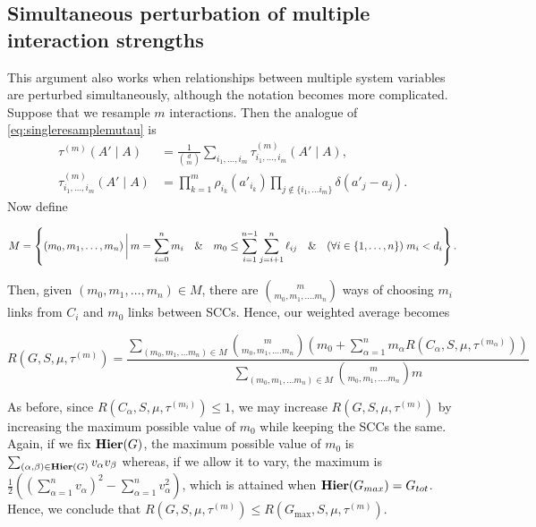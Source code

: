 \subsection{Simultaneous perturbation of multiple interaction strengths}
This argument also works when relationships between multiple system variables are perturbed simultaneously,
although the notation becomes more complicated.  Suppose that we
resample $m$ interactions.  Then the analogue of \ref{eq:singleresamplemutau} is
\begin{equation}\label{eq:multipleresamplemutau}
\begin{aligned}
\tau^{(m)}(A' \mid A) &= \frac{1}{\binom{d}{m}} \sum_{i_1, \ldots, i_m}
  \tau^{(m)}_{i_1, \ldots, i_m} (A' \mid A), \\
\tau^{(m)}_{i_1, \ldots, i_m} (A' \mid A) &=
 \prod_{k=1}^m \rho_{i_k} (a'_{i_k})
 \prod_{j \notin \{i_1, \ldots i_m\}} \delta(a'_j - a_j).
\end{aligned}
\end{equation}
Now define
\begin{widetext}
\begin{equation*}
M = \left\{(m_0, m_1, \ldots, m_n) \,\bigg|\,
m = \sum_{i=0}^n m_i \quad\&\quad
m_0 \le \sum_{i=1}^{n-1} \sum_{j=i+1}^n \ell_{ij} \quad\&\quad
(\forall i \in \{1, \ldots, n\}) \; m_i < d_i \right\}.
\end{equation*}
\end{widetext}
Then, given $(m_0, m_1, \ldots, m_n) \in M$, there are ${m \choose
m_0, m_1, \ldots. m_n}$ ways of choosing $m_i$ links from $C_i$ and
$m_0$ links between SCCs.  Hence, our
weighted average becomes
\begin{widetext}
\begin{equation}\label{eq:robustnessmultiple}
R(G, S, \mu, \tau^{(m)}) =
\frac{\sum\limits_{(m_0, m_1, \ldots m_n) \in M}
      {m \choose m_0, m_1, \ldots. m_n}
      \left(m_0 + \sum\limits_{\alpha=1}^n m_\alpha R(C_\alpha, S, \mu, \tau^{(m_\alpha)}) \right)}
     {\sum\limits_{(m_0, m_1, \ldots m_n) \in M}
      {m \choose m_0, m_1, \ldots. m_n} m}
\end{equation}
\end{widetext}

As before, since $R(C_\alpha, S, \mu, \tau^{(m_i)}) \le 1$, we may
increase $R(G, S, \mu, \tau^{(m)})$ by increasing the maximum
possible value of $m_0$ while keeping the SCCs the same.  Again, if we fix $\mathbf{Hier}(G)$, the maximum
possible value of $m_0$ is $\sum_{(\alpha,\beta) \in \mathbf{Hier}(G)} v_\alpha v_\beta$
whereas, if we allow it to vary, the maximum is $\frac{1}{2} ((\sum_{\alpha=1}^n
v_\alpha)^2 - \sum_{\alpha=1}^n v_\alpha^2)$, which is attained when $\mathbf{Hier}(G_{max}) =
G_{tot}$.  Hence, we conclude that $R(G, S, \mu, \tau^{(m)}) \le
R(G_{\mathrm{max}}, S, \mu, \tau^{(m)})$.

